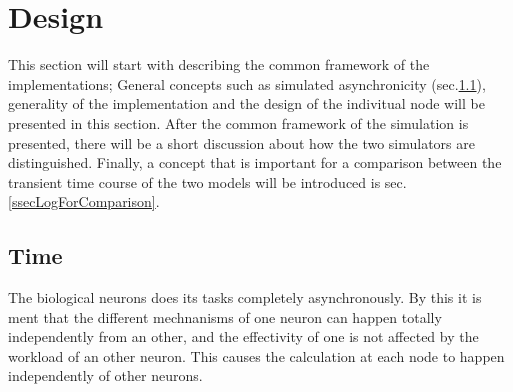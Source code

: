 \section{Design} %

	This section will start with describing the common framework of the implementations; 
		General concepts such as simulated asynchronicity (sec.\ref{ssecTime}), generality of the implementation and the design of the indivitual node will be presented in this section. %
	After the common framework of the simulation is presented, there will be a short discussion about how the two simulators are distinguished. %
	Finally, a concept that is important for a comparison between the transient time course of the two models will be introduced is sec. \ref{ssecLogForComparison}. %
	
	




	\subsection{Time}
	\label{ssecTime}
	The biological neurons does its tasks completely asynchronously.
	By this it is ment that the different mechnanisms of one neuron can happen totally independently from an other, and the effectivity of one is not affected by the workload of an other neuron.
	This causes the calculation at each node to happen independently of other neurons.


